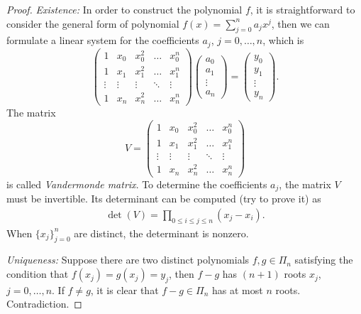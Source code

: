 \begin{proof}
   \noindent \emph{Existence: }In order to construct the polynomial $f$, it is straightforward to consider the general form of polynomial $f(x) = \sum_{j=0}^n a_j x^j$, then we can formulate a linear system for the coefficients $a_j$, $j=0,\dots, n$, which is 
    \begin{equation*}
        \begin{pmatrix}
            1 & x_0 & x_0^2 & \dots & x_0^n \\
            1 & x_1 & x_1^2 & \dots & x_1^n \\
            \vdots & \vdots &\vdots & \ddots & \vdots\\
            1 & x_n & x_n^2 & \dots & x_n^n
        \end{pmatrix} \begin{pmatrix}
            a_0\\a_1\\\vdots\\a_n
        \end{pmatrix} = \begin{pmatrix}
            y_0\\y_1\\\vdots \\y_n
        \end{pmatrix}.
    \end{equation*}
    The matrix 
    $$V = \begin{pmatrix}
        1 & x_0 & x_0^2 & \dots & x_0^n \\
        1 & x_1 & x_1^2 & \dots & x_1^n \\
        \vdots & \vdots &\vdots & \ddots & \vdots\\
        1 & x_n & x_n^2 & \dots & x_n^n
    \end{pmatrix} $$
    is called \emph{Vandermonde matrix}.
    To determine the coefficients $a_j$, the matrix $V$ must be invertible. Its determinant can be computed (try to prove it) as
    \begin{eqnarray}
        \det(V) = \prod_{0\le i\le j\le n}(x_j - x_i).
    \end{eqnarray}
    When $\{x_j\}_{j=0}^n$ are distinct, the determinant is nonzero.

   \noindent \emph{Uniqueness: }
    Suppose there are two distinct polynomials $f, g\in \Pi_n$ satisfying the condition that $f(x_j) = g(x_j) = y_j$, then $f - g$ has $(n+1)$ roots $x_j$, $j=0, \dots, n$. If $f\neq g$, it is clear that $f-g\in\Pi_n$ has at most $n$ roots. Contradiction.
\end{proof}

